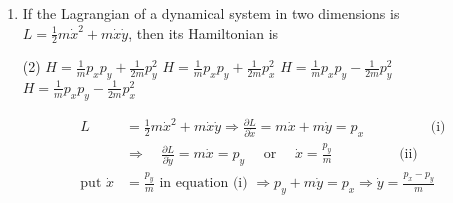 \begin{enumerate}
	{}
	\begin{tasks}(1)
		\task[\textbf{a.}]Both straight lines
		\task[\textbf{b.}]A straight line and a hyperbola respectively
		\task[\textbf{c.}]A hyperbola and an ellipse, respectively
		\task[\textbf{d.}] Both hyperbolas
	\end{tasks}
\begin{answer}
	\begin{align*}
	H&=x p_{x}-y p_{y}-\frac{1}{2} x^{2}+\frac{1}{2} y^{2}
	\intertext{Solving Hamiltonion equation of motion}
	\frac{\partial H}{\partial x}&=-\dot{p}_{x} \Rightarrow p_{x}-x=-\dot{p}_{x}\text{ and } \frac{\partial H}{\partial y}\\&=-\dot{p}_{y} \Rightarrow-p_{y}+y=-\dot{p}_{y}\\
	\frac{\partial H}{\partial p_{x}}&=\dot{x} \Rightarrow x=\dot{x}\text{ and }\frac{\partial H}{\partial p_{y}}=\dot{y} \Rightarrow-y=\dot{y}
	\intertext{After solving these four differential equation and eliminating time $t$ and using boundary condition one will get $\Rightarrow x=\frac{1}{y}$ and $p_{x}=\frac{1}{2} \frac{1}{p_{y}}$}
	\end{align*}
	So the correct answer is \textbf{Option (d)}
\end{answer}
	\item  If the Lagrangian of a dynamical system in two dimensions is $L=\frac{1}{2} m \dot{x}^{2}+m \dot{x} \dot{y}$, then its Hamiltonian is
	{}
	\begin{tasks}(2)
		\task[\textbf{a.}]$H=\frac{1}{m} p_{x} p_{y}+\frac{1}{2 m} p_{y}^{2}$
		\task[\textbf{b.}] $H=\frac{1}{m} p_{x} p_{y}+\frac{1}{2 m} p_{x}^{2}$
		\task[\textbf{c.}]$H=\frac{1}{m} p_{x} p_{y}-\frac{1}{2 m} p_{y}^{2}$
		\task[\textbf{d.}] $H=\frac{1}{m} p_{x} p_{y}-\frac{1}{2 m} p_{x}^{2}$
	\end{tasks}
\begin{answer}
	\begin{align*}
	L&=\frac{1}{2} m \dot{x}^{2}+m \dot{x} \dot{y} \Rightarrow \frac{\partial L}{\partial \dot{x}}=m \dot{x}+m \dot{y}=p_{x}\hspace{2cm}\text{(i)}\\
	&\Rightarrow \quad \frac{\partial L}{\partial \dot{y}}=m \dot{x}=p_{y} \quad\text{ or }\quad \dot{x}=\frac{p_{y}}{m}\hspace{2cm}\text{(ii)}\\
	\text{put }\dot{x}&=\frac{p_{y}}{m} \text{ in equation (i) }\Rightarrow p_{y}+m \dot{y}=p_{x} \Rightarrow \dot{y}=\frac{p_{x}-p_{y}}{m}\\

\end{align*}
\end{answer}
\end{enumerate}
